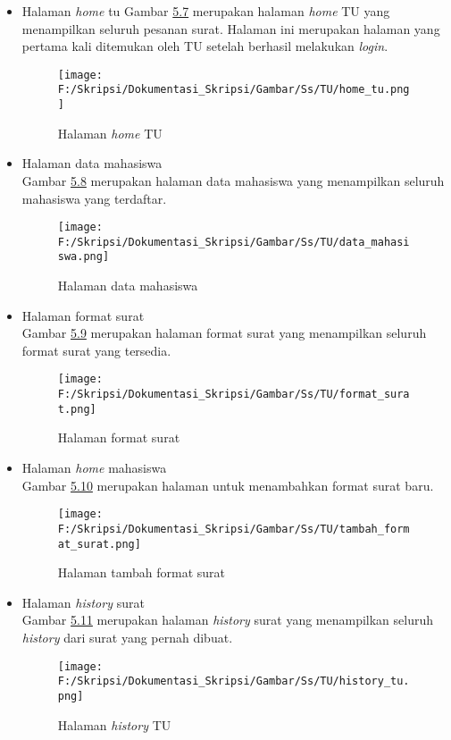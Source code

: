 \begin{itemize}
	\item Halaman \textit{home} tu
	 Gambar \hyperlink{halaman_home_tu}{5.7} merupakan halaman \textit{home} TU yang menampilkan seluruh pesanan surat. Halaman ini merupakan halaman yang pertama kali ditemukan oleh TU setelah berhasil melakukan \textit{login}.
	 \begin{figure}[H]
	\centering
		\texttt{[image: F:/Skripsi/Dokumentasi\_Skripsi/Gambar/Ss/TU/home\_tu.png]}
		\caption{Halaman \textit{home} TU}
		\label{fig:halaman_home_tu}
	\end{figure}

	\item Halaman data mahasiswa\\
	 Gambar \hyperlink{implementasi_halaman_data_mahasiswa}{5.8} merupakan halaman data mahasiswa yang menampilkan seluruh mahasiswa yang terdaftar.
	 \begin{figure}[H]
	\centering
		\texttt{[image: F:/Skripsi/Dokumentasi\_Skripsi/Gambar/Ss/TU/data\_mahasiswa.png]}
		\caption{Halaman data mahasiswa}
		\label{fig:implementasi_halaman_data_mahasiswa}
	\end{figure}
	
	\item Halaman format surat\\
	 Gambar \hyperlink{implementasi_halaman_format_surat}{5.9} merupakan halaman format surat yang menampilkan seluruh format surat yang tersedia.
	 \begin{figure}[H]
	\centering
		\texttt{[image: F:/Skripsi/Dokumentasi\_Skripsi/Gambar/Ss/TU/format\_surat.png]}
		\caption{Halaman format surat}
		\label{fig:implementasi_halaman_format_surat}
	\end{figure}
	
	\item Halaman \textit{home} mahasiswa\\
	 Gambar \hyperlink{implementasi_halaman_tambah_format_surat}{5.10} merupakan halaman untuk menambahkan format surat baru.
	 \begin{figure}[H]
	\centering
		\texttt{[image: F:/Skripsi/Dokumentasi\_Skripsi/Gambar/Ss/TU/tambah\_format\_surat.png]}
		\caption{Halaman tambah format surat}
		\label{fig:implementasi_halaman_tambah_format_surat}
	\end{figure}
	
	\item Halaman \textit{history} surat\\
	 Gambar \hyperlink{halaman_history_tu}{5.11} merupakan halaman \textit{history} surat yang menampilkan seluruh \textit{history} dari surat yang pernah dibuat.
	 \begin{figure}[H]
	\centering
		\texttt{[image: F:/Skripsi/Dokumentasi\_Skripsi/Gambar/Ss/TU/history\_tu.png]}
		\caption{Halaman \textit{history} TU}
		\label{fig:halaman_history_tu}
	\end{figure}
	

\end{itemize}
